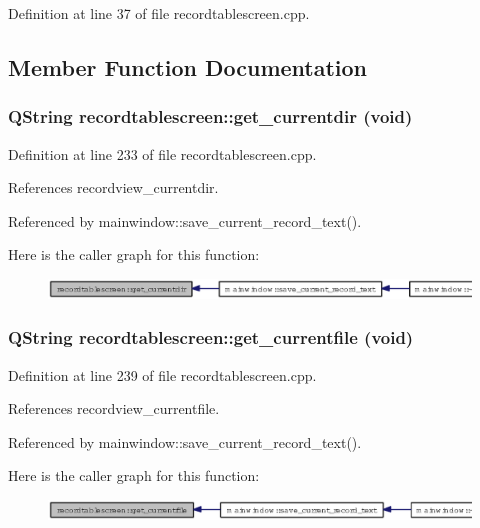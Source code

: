 Definition at line 37 of file recordtablescreen.cpp.

\subsection{Member Function Documentation}
\subsubsection{\setlength{\rightskip}{0pt plus 5cm}QString recordtablescreen::get\_\-currentdir (void)}\label{classrecordtablescreen_5f419b091a8911fa8be695b6c5956e7e}




Definition at line 233 of file recordtablescreen.cpp.

References recordview\_\-currentdir.

Referenced by mainwindow::save\_\-current\_\-record\_\-text().

Here is the caller graph for this function:\begin{figure}[H]
\begin{center}
\leavevmode
\includegraphics[width=338pt]{classrecordtablescreen_5f419b091a8911fa8be695b6c5956e7e_icgraph}
\end{center}
\end{figure}
\subsubsection{\setlength{\rightskip}{0pt plus 5cm}QString recordtablescreen::get\_\-currentfile (void)}\label{classrecordtablescreen_e7502491e7959dc271a55ed39d255a9d}




Definition at line 239 of file recordtablescreen.cpp.

References recordview\_\-currentfile.

Referenced by mainwindow::save\_\-current\_\-record\_\-text().

Here is the caller graph for this function:\begin{figure}[H]
\begin{center}
\leavevmode
\includegraphics[width=339pt]{classrecordtablescreen_e7502491e7959dc271a55ed39d255a9d_icgraph}
\end{center}
\end{figure}
